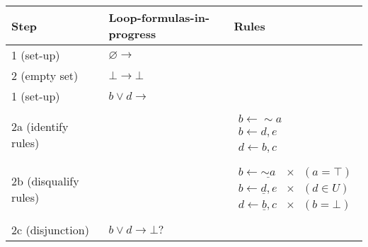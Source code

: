 \documentclass[9pt,a4paper,landscape]{article}
\begin{document}
{\begin{center}
	\begin{tabular}{p{3cm}p{5cm}p{6cm}}
		Step & Loop-formulas-in-progress & Rules \\ \midrule
		1 (set-up) & $\varnothing \rightarrow$ & \\
		2 (empty set) & $\bot \rightarrow \bot$ & \\ \midrule
		
		1 (set-up) & $b \lor d \rightarrow$ & \\ & \\
		2a (identify rules) &  & $\begin{array}{l}
		b \leftarrow {\sim} a\\
		b \leftarrow d, e\\
		d \leftarrow b, c
		\end{array}$  \\ & \\
		2b (disqualify rules) &  & $\begin{array}{ll}
		b \leftarrow \underline{{\sim} a} & \times \hspace{8pt} (a = \top) \\
		b \leftarrow \underline{d}, e & \times \hspace{8pt} (d \in U) \\
		d \leftarrow \underline{b}, c & \times \hspace{8pt} (b = \bot) 
		\end{array}$  \\ & \\
		2c (disjunction) & $b \lor d \rightarrow \bot ?$ \\ \midrule

\end{tabular}
\end{center}}
\end{document}
